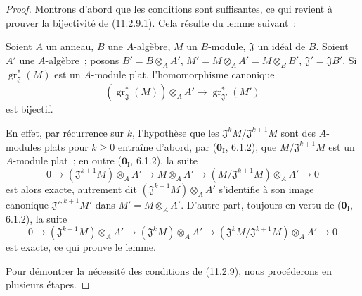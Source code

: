 \begin{proof}
Montrons d'abord que les conditions sont suffisantes, ce qui revient à prouver
la bijectivité de (11.2.9.1). Cela résulte du lemme suivant~:

\begin{lemma}[11.2.9.2]
\label{IV.11.2.9.2-fr}
Soient $A$ un anneau, $B$ une $A$-algèbre, $M$ un $B$-module, $\mathfrak J$ un
idéal de $B$. Soient $A'$ une $A$-algèbre~; posons
$B'=B\otimes_AA'$, $M'=M\otimes_AA'=M\otimes_BB'$,
$\mathfrak J'=\mathfrak JB'$. Si
$\operatorname{gr}_{\mathfrak J}^*(M)$ est un $A$-module plat,
l'homomorphisme canonique
\[
(\operatorname{gr}_{\mathfrak J}^*(M))\otimes_AA'
\longrightarrow \operatorname{gr}_{\mathfrak J'}^*(M')
\]
est bijectif.
\end{lemma}


En effet, par récurrence sur $k$, l'hypothèse que les
$\mathfrak J^kM/\mathfrak J^{k+1}M$ sont des $A$-modules plats pour $k\geq0$
entraîne d'abord, par ($\mathbf 0_{\mathrm I}$, 6.1.2), que
$M/\mathfrak J^{k+1}M$ est un $A$-module plat~; en outre
($\mathbf 0_{\mathrm I}$, 6.1.2), la suite
\[
0\longrightarrow(\mathfrak J^{k+1}M)\otimes_AA'
\longrightarrow M\otimes_AA'
\longrightarrow(M/\mathfrak J^{k+1}M)\otimes_AA'\longrightarrow0
\]
est alors exacte, autrement dit $(\mathfrak J^{k+1}M)\otimes_AA'$ s'identifie
à son image canonique $\mathfrak J'^{,k+1}M'$ dans $M'=M\otimes_AA'$.
D'autre part, toujours en vertu de ($\mathbf 0_{\mathrm I}$, 6.1.2), la suite
\[
0\longrightarrow(\mathfrak J^{k+1}M)\otimes_AA'
\longrightarrow(\mathfrak J^kM)\otimes_AA'
\longrightarrow(\mathfrak J^kM/\mathfrak J^{k+1}M)\otimes_AA'
\longrightarrow0
\]
est exacte, ce qui prouve le lemme.

Pour démontrer la nécessité des conditions de (11.2.9), nous procéderons en
plusieurs étapes.


\end{proof}
